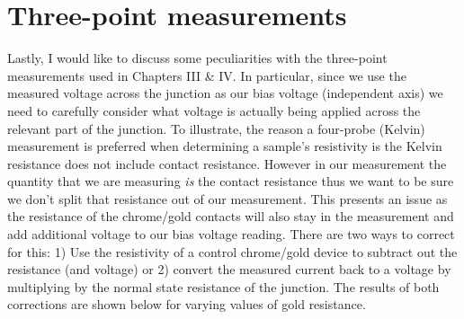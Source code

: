 \section{Three-point measurements}
Lastly, I would like to discuss some peculiarities with the three-point measurements used in Chapters III \& IV. In particular, since we use the measured voltage across the junction as our bias voltage (independent axis) we need to carefully consider what voltage is actually being applied across the relevant part of the junction. To illustrate, the reason a four-probe (Kelvin) measurement is preferred when determining a sample's resistivity is the Kelvin resistance does not include contact resistance\cite{Kuphaldt2015}. However in our measurement the quantity that we are measuring \textit{is} the contact resistance thus we want to be sure we don't split that resistance out of our measurement. This presents an issue as the resistance of the chrome/gold contacts will also stay in the measurement and add additional voltage to our bias voltage reading. There are two ways to correct for this: 1) Use the resistivity of a control chrome/gold device to subtract out the resistance (and voltage) or 2) convert the measured current back to a voltage by multiplying by the normal state resistance of the junction. The results of both corrections are shown below for varying values of gold resistance.